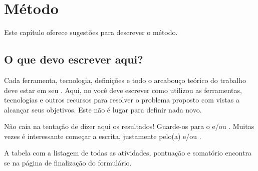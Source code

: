 \chapter{Método}
\label{Metodo}
\indent
Este capítulo oferece sugestões para descrever o método.

\section{O que devo escrever aqui?}%

Cada ferramenta, tecnologia, definições e todo o arcabouço teórico do trabalho deve estar em seu .
Aqui, no  você deve escrever como utilizou as ferramentas, tecnologias e outros recursos para resolver o problema proposto com vistas a alcançar seus objetivos.
Este não é lugar para definir nada novo.


Não caia na tentação de dizer aqui os resultados! Guarde-os para o  e/ou . Muitas vezes é interessante começar a escrita, justamente pelo(a)  e/ou .

\selectfont%
A tabela com a listagem de todas as atividades, pontuação e somatório encontra se na página de finalização do formulário.

